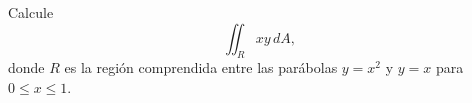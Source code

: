 Calcule
\[
\iint_R xy\,dA,
\]
donde $R$ es la región comprendida entre las parábolas $y=x^2$ y $y=x$ para $0\leq x\leq1$.
